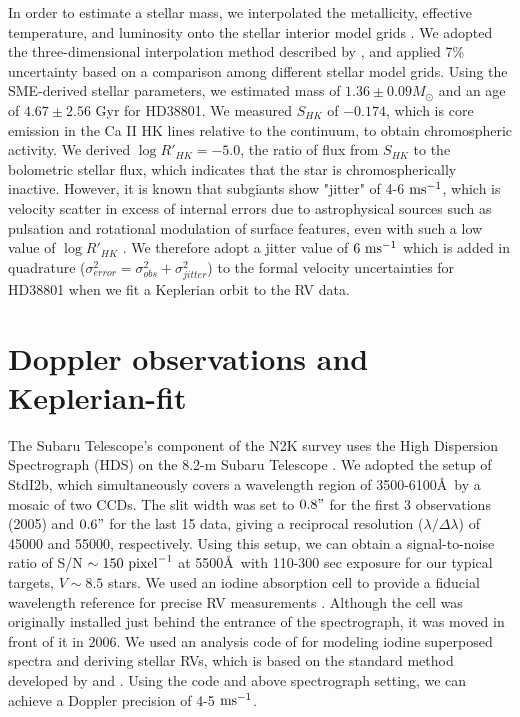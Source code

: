 \documentclass[manuscript]{aastex}
\newcommand{\mps}{{\rm ms}^{-1}}
\begin{document}
In order to estimate a stellar mass, we interpolated the metallicity, effective temperature, and 
luminosity onto the stellar interior model grids \citep{2002A&A...391..195G}.
We adopted the three-dimensional interpolation method described by \cite{2007ApJ...665..785J}, and applied 
7\% uncertainty based on a comparison among different stellar model grids.
Using the SME-derived stellar parameters, we estimated mass of $1.36\pm0.09M_{\odot}$ and an age of $4.67\pm2.56$ Gyr for HD38801.
We measured $S_{HK}$ of $-0.174$, which is core emission in the Ca II HK lines relative to the continuum, 
to obtain chromospheric activity. We derived $\log R'_{HK}=-5.0$, the ratio of flux from $S_{HK}$ to the 
bolometric stellar flux, which indicates that the star is chromospherically inactive.
However, it is known that subgiants show "jitter" of 4-6 $\mps$, which is velocity scatter in excess of 
internal errors due to astrophysical sources such as pulsation and rotational modulation of surface features, 
even with such a low value of $\log R'_{HK}$ \citep{2007ApJ...665..785J}.
We therefore adopt a jitter value of $6\ \mps$ which is added in quadrature 
($\sigma_{error}^2 = \sigma_{obs}^2 + \sigma_{jitter}^2$) to the formal 
velocity uncertainties for HD38801 when we fit a Keplerian orbit 
to the RV data.

\section{Doppler observations and Keplerian-fit}
\label{sec_obs}
The Subaru Telescope's component of the N2K survey uses the High Dispersion Spectrograph (HDS) on the 8.2-m Subaru Telescope \citep{2002PASJ...54..855N}.
We adopted the setup of StdI2b, which simultaneously covers a wavelength region of 3500-6100\AA\ by a mosaic of two CCDs.
The slit width was set to $0.8"$ for the first 3 observations (2005) and $0.6"$ for the last 15 data, giving a reciprocal resolution ($\lambda /\Delta \lambda$) of 45000 and 55000, respectively.
Using this setup, we can obtain a signal-to-noise ratio of S/N $\sim 150\ {\rm pixel}^{-1}$ at 
5500\AA\ with 110-300 sec exposure for our typical targets, $V \sim 8.5$ stars.
We used an iodine absorption cell to provide a fiducial wavelength reference for precise RV measurements \citep{2002PASJ...54..865K,2002PASJ...54..873S}. 
Although the cell was originally installed just behind the entrance of the spectrograph, it was moved in front of it in 2006.
We used an analysis code of \cite{2002PASJ...54..873S} for modeling iodine superposed spectra and deriving stellar RVs, which is based on the standard method developed by \cite{1996PASP..108..500B} and \cite{1995PASP..107..966V}.
Using the code and above spectrograph setting, we can achieve a Doppler precision of 4-5 $\mps$.
\end{document}

